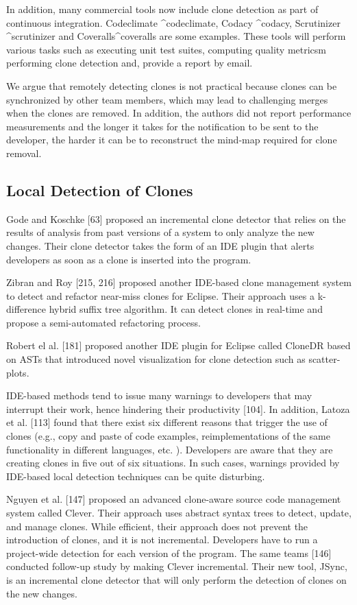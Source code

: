 \documentclass[12pt]{report}
\begin{document}
In addition, many commercial tools now include clone detection as part
of continuous integration. Codeclimate \^{}codeclimate, Codacy
\^{}codacy, Scrutinizer \^{}scrutinizer and Coveralls\^{}coveralls are
some examples. These tools will perform various tasks such as executing
unit test suites, computing quality metricsm performing clone detection
and, provide a report by email.

We argue that remotely detecting clones is not practical because clones
can be synchronized by other team members, which may lead to challenging
merges when the clones are removed. In addition, the authors did not
report performance measurements and the longer it takes for the
notification to be sent to the developer, the harder it can be to
reconstruct the mind-map required for clone removal.

\subsection{Local Detection of Clones}\label{local-detection-of-clones}

Gode and Koschke {[}63{]} proposed an incremental clone detector that
relies on the results of analysis from past versions of a system to only
analyze the new changes. Their clone detector takes the form of an IDE
plugin that alerts developers as soon as a clone is inserted into the
program.

Zibran and Roy {[}215, 216{]} proposed another IDE-based clone
management system to detect and refactor near-miss clones for Eclipse.
Their approach uses a k-difference hybrid suffix tree algorithm. It can
detect clones in real-time and propose a semi-automated refactoring
process.

Robert el al. {[}181{]} proposed another IDE plugin for Eclipse called
CloneDR based on ASTs that introduced novel visualization for clone
detection such as scatter-plots.

IDE-based methods tend to issue many warnings to developers that may
interrupt their work, hence hindering their productivity {[}104{]}. In
addition, Latoza et al. {[}113{]} found that there exist six different
reasons that trigger the use of clones (e.g., copy and paste of code
examples, reimplementations of the same functionality in different
languages, etc. ). Developers are aware that they are creating clones in
five out of six situations. In such cases, warnings provided by
IDE-based local detection techniques can be quite disturbing.

Nguyen et al. {[}147{]} proposed an advanced clone-aware source code
management system called Clever. Their approach uses abstract syntax
trees to detect, update, and manage clones. While efficient, their
approach does not prevent the introduction of clones, and it is not
incremental. Developers have to run a project-wide detection for each
version of the program. The same teams {[}146{]} conducted follow-up
study by making Clever incremental. Their new tool, JSync, is an
incremental clone detector that will only perform the detection of
clones on the new changes.
\end{document}
